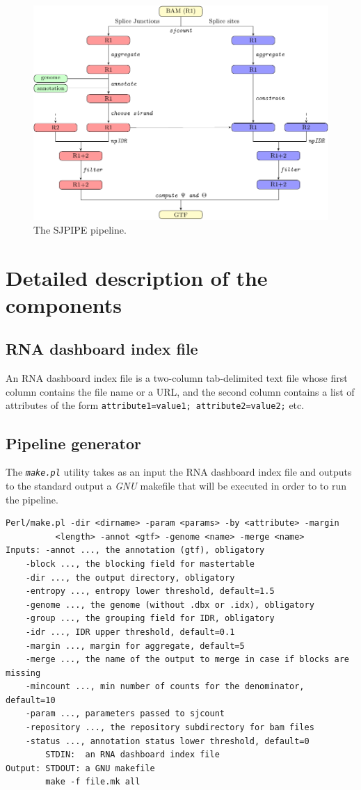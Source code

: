 \documentclass{article}
\newcommand{\prog}[1]{{\tt\em #1}}
\begin{document}
\begin{figure}
\centering
\includegraphics[width=\textwidth]{fig1_crop.pdf}
\caption{The SJPIPE pipeline.\label{fig::sjpipe}}
\end{figure}


\section{Detailed description of the components}
\subsection{RNA dashboard index file}
An RNA dashboard index file is a two-column tab-delimited text file whose first column contains the file name or a URL, and the second column contains a list of attributes of the form
{\tt attribute1=value1; attribute2=value2;} etc. 

\subsection{Pipeline generator}
The \prog{make.pl} utility takes as an input the RNA dashboard index file and outputs to the standard output a {\em GNU} makefile that 
will be executed in order to to run the pipeline.
\begin{verbatim} 
Perl/make.pl -dir <dirname> -param <params> -by <attribute> -margin 
          <length> -annot <gtf> -genome <name> -merge <name>
Inputs: -annot ..., the annotation (gtf), obligatory
	-block ..., the blocking field for mastertable
	-dir ..., the output directory, obligatory
	-entropy ..., entropy lower threshold, default=1.5
	-genome ..., the genome (without .dbx or .idx), obligatory
	-group ..., the grouping field for IDR, obligatory
	-idr ..., IDR upper threshold, default=0.1
	-margin ..., margin for aggregate, default=5
	-merge ..., the name of the output to merge in case if blocks are missing
	-mincount ..., min number of counts for the denominator, default=10
	-param ..., parameters passed to sjcount
	-repository ..., the repository subdirectory for bam files
	-status ..., annotation status lower threshold, default=0
        STDIN:  an RNA dashboard index file 
Output: STDOUT: a GNU makefile
        make -f file.mk all
\end{verbatim} 
\end{document}
